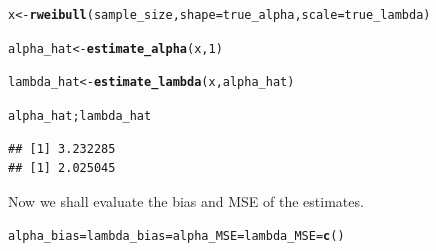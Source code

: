 \documentclass[11pt, a4paper]{article}\usepackage[]{graphicx}\usepackage[]{xcolor}
\makeatletter
\newcommand{\hlnum}[1]{\textcolor[rgb]{0.686,0.059,0.569}{#1}}%
\newcommand{\hldef}[1]{\textcolor[rgb]{0.345,0.345,0.345}{#1}}%
\newcommand{\hlkwb}[1]{\textcolor[rgb]{0.69,0.353,0.396}{#1}}%
\newcommand{\hlkwc}[1]{\textcolor[rgb]{0.333,0.667,0.333}{#1}}%
\newcommand{\hlkwd}[1]{\textcolor[rgb]{0.737,0.353,0.396}{\textbf{#1}}}%
\newenvironment{kframe}{%
 \def\at@end@of@kframe{}%
 \ifinner\ifhmode%
  \def\at@end@of@kframe{\end{minipage}}%
  \begin{minipage}{\columnwidth}%
 \fi\fi%
 \def\FrameCommand##1{\hskip\@totalleftmargin \hskip-\fboxsep
 \colorbox{shadecolor}{##1}\hskip-\fboxsep
     \hskip-\linewidth \hskip-\@totalleftmargin \hskip\columnwidth}%
 \MakeFramed {\advance\hsize-\width
   \@totalleftmargin\z@ \linewidth\hsize
   \@setminipage}}%
 {\par\unskip\endMakeFramed%
 \at@end@of@kframe}
\newenvironment{knitrout}{}{} %
\makeatother
\begin{document}
\begin{knitrout}
\color{fgcolor}\begin{kframe}
\begin{alltt}
\hldef{x} \hlkwb{<-} \hlkwd{rweibull}\hldef{(sample_size,} \hlkwc{shape} \hldef{= true_alpha,} \hlkwc{scale} \hldef{= true_lambda)}

\hldef{alpha_hat} \hlkwb{<-} \hlkwd{estimate_alpha}\hldef{(x,} \hlnum{1}\hldef{)}

\hldef{lambda_hat} \hlkwb{<-} \hlkwd{estimate_lambda}\hldef{(x, alpha_hat)}
\end{alltt}
\end{kframe}
\end{knitrout}

\newpage


\begin{knitrout}
\color{fgcolor}\begin{kframe}
\begin{alltt}
\hldef{alpha_hat; lambda_hat}
\end{alltt}
\begin{verbatim}
## [1] 3.232285
## [1] 2.025045
\end{verbatim}
\end{kframe}
\end{knitrout}

Now we shall evaluate the bias and MSE of the estimates.

\begin{knitrout}
\color{fgcolor}\begin{kframe}
\begin{alltt}
\hldef{alpha_bias} \hlkwb{=} \hldef{lambda_bias} \hlkwb{=} \hldef{alpha_MSE} \hlkwb{=} \hldef{lambda_MSE} \hlkwb{=} \hlkwd{c}\hldef{()}
\end{alltt}
\end{kframe}
\end{knitrout}
\end{document}
